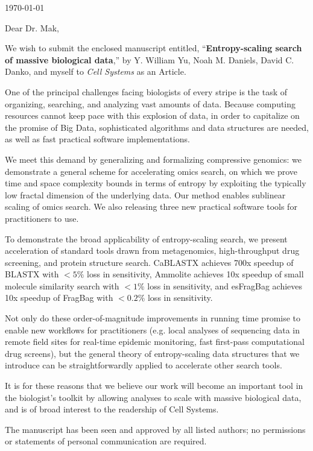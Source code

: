 \documentclass{article}
\begin{document}
\hspace*{0.5\linewidth}

\today

\bigskip

Dear Dr. Mak,

We wish to submit the enclosed manuscript entitled,
``\textbf{Entropy-scaling search of massive biological data},''
by Y. William Yu, Noah M. Daniels, David C. Danko, and myself
to \textit{Cell Systems} as an Article.

One of the principal challenges facing biologists of every stripe is the task 
of organizing, searching, and analyzing vast amounts of data.
Because computing resources cannot keep pace with this explosion of data, in order to capitalize on the promise of Big Data, sophisticated algorithms and data structures are needed, as well as fast practical software implementations.

We meet this demand by generalizing and formalizing compressive 
genomics: we demonstrate a general scheme for accelerating omics search, on which we prove time and space complexity bounds in terms 
of entropy by exploiting the typically low fractal dimension of the underlying 
data. 
Our method enables sublinear scaling of omics search.
We also releasing three new practical software tools for practitioners to use.
 
To demonstrate the broad applicability of entropy-scaling search, we present acceleration of standard tools drawn from metagenomics, high-throughput drug screening, and protein structure search.
CaBLASTX achieves 700x speedup of BLASTX with $<5\%$ loss in sensitivity, Ammolite achieves 10x speedup of small molecule similarity search with $<1\%$ 
loss in sensitivity, and esFragBag achieves 10x speedup of FragBag with $<0.2\%$ loss in sensitivity.

Not only do these order-of-magnitude improvements in running time promise to enable new workflows for practitioners (e.g. local analyses of sequencing data in remote field sites for real-time epidemic monitoring, fast first-pass computational drug screens), but the general theory of entropy-scaling data structures that we introduce can be straightforwardly applied to accelerate other search tools.

It is for these reasons that we believe our work will become an important tool in the biologist's toolkit by allowing analyses to scale with massive biological data, and is of broad interest to the readership of Cell Systems.

The manuscript has been seen and approved by all listed authors; no permissions or statements of personal communication are required.
\end{document}
